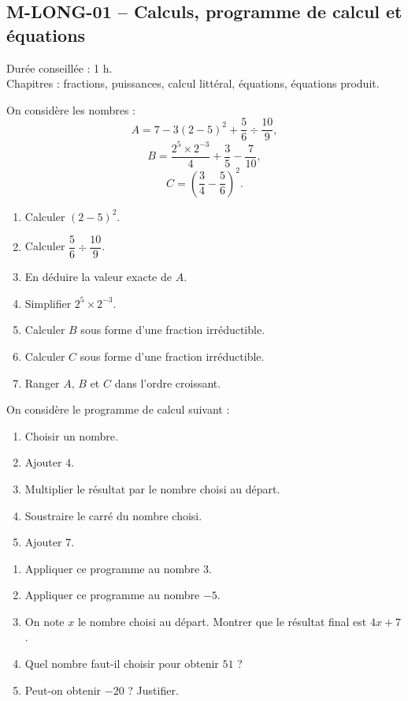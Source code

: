 \subsection{M-LONG-01 -- Calculs, programme de calcul et équations}

\begin{objectif}
Durée conseillée : 1 h.\\
Chapitres : fractions, puissances, calcul littéral, équations, équations produit.
\end{objectif}

\begin{exercice}
On considère les nombres :
\[
A=7-3(2-5)^2+\frac{5}{6}\div\frac{10}{9},
\]
\[
B=\frac{2^5\times 2^{-3}}{4}+\frac{3}{5}-\frac{7}{10},
\]
\[
C=\left(\frac{3}{4}-\frac{5}{6}\right)^2.
\]

\begin{enumerate}
  \item Calculer $(2-5)^2$.
  \item Calculer $\dfrac{5}{6}\div\dfrac{10}{9}$.
  \item En déduire la valeur exacte de $A$.
  \item Simplifier $2^5\times2^{-3}$.
  \item Calculer $B$ sous forme d'une fraction irréductible.
  \item Calculer $C$ sous forme d'une fraction irréductible.
  \item Ranger $A$, $B$ et $C$ dans l'ordre croissant.
\end{enumerate}
\end{exercice}

\begin{exercice}
On considère le programme de calcul suivant :
\begin{enumerate}
  \item Choisir un nombre.
  \item Ajouter $4$.
  \item Multiplier le résultat par le nombre choisi au départ.
  \item Soustraire le carré du nombre choisi.
  \item Ajouter $7$.
\end{enumerate}

\begin{enumerate}
  \item Appliquer ce programme au nombre $3$.
  \item Appliquer ce programme au nombre $-5$.
  \item On note $x$ le nombre choisi au départ. Montrer que le résultat final est $4x+7$.
  \item Quel nombre faut-il choisir pour obtenir $51$ ?
  \item Peut-on obtenir $-20$ ? Justifier.
\end{enumerate}
\end{exercice}

